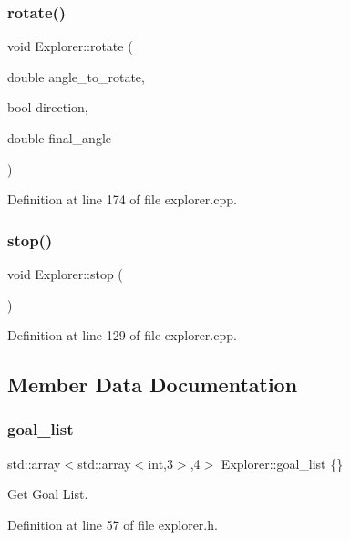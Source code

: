 \subsubsection{\texorpdfstring{rotate()}{rotate()}}
{\footnotesize\ttfamily void Explorer\+::rotate (\begin{DoxyParamCaption}\item[{double}]{angle\+\_\+to\+\_\+rotate,  }\item[{bool}]{direction,  }\item[{double}]{final\+\_\+angle }\end{DoxyParamCaption})}



Definition at line 174 of file explorer.\+cpp.

\mbox{\label{class_explorer_a0e4a623ff30d1886cc9f57ec081c527f}} 
\subsubsection{\texorpdfstring{stop()}{stop()}}
{\footnotesize\ttfamily void Explorer\+::stop (\begin{DoxyParamCaption}{ }\end{DoxyParamCaption})}



Definition at line 129 of file explorer.\+cpp.



\subsection{Member Data Documentation}
\mbox{\label{class_explorer_acda1856f421dfe836f39de446415b969}} 
\subsubsection{\texorpdfstring{goal\+\_\+list}{goal\_list}}
{\footnotesize\ttfamily std\+::array$<$std\+::array$<$int,3$>$,4$>$ Explorer\+::goal\+\_\+list \{\}}



Get Goal List. 



Definition at line 57 of file explorer.\+h.

